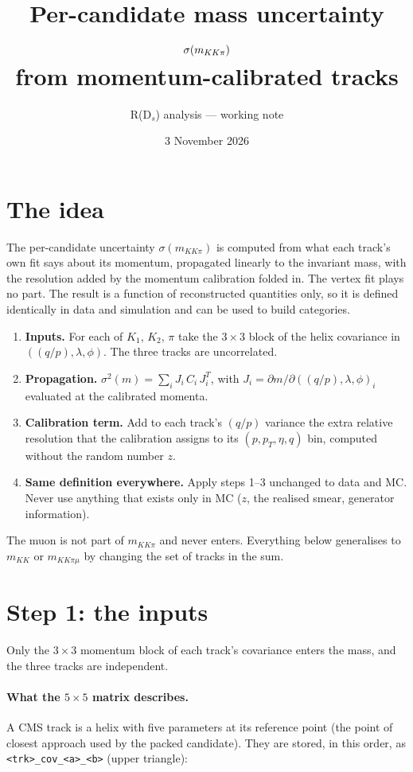 \documentclass[11pt,a4paper]{article}
\title{Per-candidate mass uncertainty $\sigma(\mKKpi)$\\ from momentum-calibrated tracks}
\author{R(D$_s$) analysis --- working note}
\date{3 November 2026}
\newcommand{\qp}{(q/p)}
\newcommand{\br}[1]{\texttt{#1}}
\newcommand{\mKKpi}{m_{KK\pi}}
\begin{document}
\maketitle

\section{The idea}

The per-candidate uncertainty $\sigma(\mKKpi)$ is computed from what each track's own fit says about its
momentum, propagated linearly to the invariant mass, with the resolution added by the momentum calibration
folded in. The vertex fit plays no part. The result is a function of reconstructed quantities only, so it is
defined identically in data and simulation and can be used to build categories.

\begin{enumerate}[label=\textbf{\arabic*.}]
  \item \textbf{Inputs.} For each of $K_1$, $K_2$, $\pi$ take the $3\times3$ block of the helix covariance in
        $(\qp, \lambda, \phi)$. The three tracks are uncorrelated.
  \item \textbf{Propagation.} $\sigma^2(m) = \sum_i J_i\, C_i\, J_i^{T}$, with
        $J_i = \partial m/\partial(\qp,\lambda,\phi)_i$ evaluated at the calibrated momenta.
  \item \textbf{Calibration term.} Add to each track's $\qp$ variance the extra relative resolution that the
        calibration assigns to its $(p, p_T, \eta, q)$ bin, computed without the random number $z$.
  \item \textbf{Same definition everywhere.} Apply steps 1--3 unchanged to data and MC. Never use anything
        that exists only in MC ($z$, the realised smear, generator information).
\end{enumerate}

The muon is not part of $\mKKpi$ and never enters. Everything below generalises to $m_{KK}$ or $m_{KK\pi\mu}$
by changing the set of tracks in the sum.

\section{Step 1: the inputs}

Only the $3\times3$ momentum block of each track's covariance enters the mass, and the three tracks are
independent.

\paragraph{What the $5\times5$ matrix describes.} A CMS track is a helix with five parameters at its
reference point (the point of closest approach used by the packed candidate). They are stored, in this
order, as \br{<trk>\_cov\_<a>\_<b>} (upper triangle):
\end{document}
